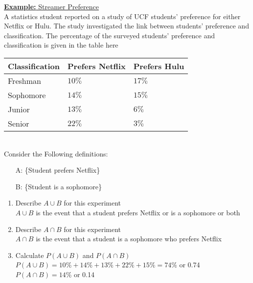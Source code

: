 \documentclass[a4paper]{article}
\let\bf\textbf
\begin{document}
\begin{shaded}
    \underline{\bf{Example:} Streamer Preference}
    \vspace{2mm}\\
    A statistics student reported on a study of UCF students’ preference for either Netflix or Hulu. The study investigated the link between students’ preference and classification. The percentage of the surveyed students’ preference and classification is given in the table here
    \vspace{1mm}\\
    \begin{tabularx}{0.8\textwidth}{ 
        | >{\raggedright\arraybackslash}X 
        | >{\centering\arraybackslash}X 
        | >{\centering\arraybackslash}X | }
        \hline
        \bf{Classification} & \bf{Prefers Netflix} & \bf{Prefers Hulu} \\
        \hline
        Freshman & $10\%$ & $17\%$ \\
        \hline
        Sophomore & $14\%$ & $15\%$ \\
        \hline
        Junior & $13\%$ & $6\%$ \\
        \hline
        Senior & $22\%$ & $3\%$ \\
        \hline
    \end{tabularx}
    \vspace{1mm}\\
    Consider the Following definitions:
    \begin{itemize}
        \item[A:] \{Student prefers Netflix\}
        \item[B:] \{Student is a sophomore\} 
    \end{itemize}
    \begin{enumerate}
        \item Describe $A \cup B$ for this experiment\\
        $A \cup B$ is the event that a student prefers Netflix or is a sophomore or both
        \item Describe $A \cap B$ for this experiment\\
        $A \cap B$ is the event that a student is a sophomore who prefers Netflix
        \item Calculate $P(A \cup B)$ and $P(A \cap B)$\\
        $P(A \cup B) = 10\% + 14\% + 13\% + 22\% + 15\% = 74\%$ or 0.74\\
        $P(A \cap B) = 14\%$ or 0.14
    \end{enumerate}
\end{shaded}
\end{document}
